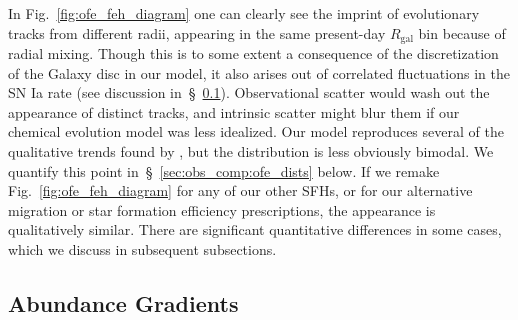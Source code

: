 \documentclass[draft2.tex]{subfiles}
\begin{document}
In Fig.~\ref{fig:ofe_feh_diagram} one can clearly see the imprint of 
evolutionary tracks from different radii, appearing in the same present-day 
$R_\text{gal}$ bin because of radial mixing. 
Though this is to some extent a consequence of the discretization of the 
Galaxy disc in our model, it also arises out of correlated fluctuations in the 
SN Ia rate (see discussion in~\S~\ref{sec:obs_comp:gradient}). 
Observational scatter would wash out the appearance of distinct tracks, and 
intrinsic scatter might blur them if our chemical evolution model was less 
idealized. 
Our model reproduces several of the qualitative trends found by 
\citet{Hayden2015}, but the distribution is less obviously bimodal. 
We quantify this point in~\S~\ref{sec:obs_comp:ofe_dists} below. 
If we remake Fig.~\ref{fig:ofe_feh_diagram} for any of our other SFHs, or for 
our alternative migration or star formation efficiency prescriptions, the 
appearance is qualitatively similar. There are significant quantitative 
differences in some cases, which we discuss in subsequent subsections. 

\subsection{Abundance Gradients} 
\label{sec:obs_comp:gradient} 
\end{document}
